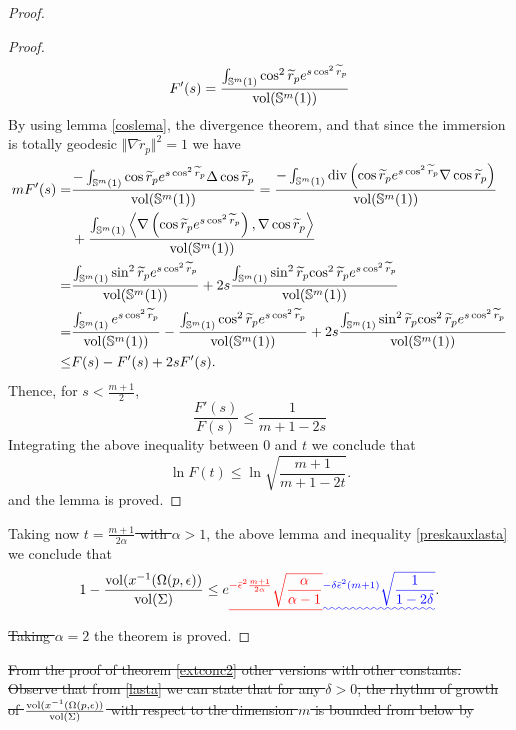 \documentclass{amsart}
\theoremstyle{definition}
\theoremstyle{remark}
\newtheorem{remark}[theorem]{Remark}
\providecommand{\DIFadd}[1]{{\protect\color{blue}\uwave{#1}}} %
\providecommand{\DIFdel}[1]{{\protect\color{red}\sout{#1}}}                      %
\providecommand{\DIFaddbegin}{} %
\providecommand{\DIFaddend}{} %
\providecommand{\DIFdelbegin}{} %
\providecommand{\DIFdelend}{} %
\begin{document}
\begin{proof}
\begin{proof}
    $$
F'(s)=\frac{\int_{\mathbb{S}^m(1)}\cos^2\widetilde{r}_pe^{s \cos^2\widetilde{r}_p}}{{\rm vol}(\mathbb{S}^m(1))}
    $$
 By using lemma \ref{coslema}, the divergence theorem, and that since the immersion is totally geodesic $\Vert \nabla\widetilde{r}_p\Vert^2=1$ we have 
 $$
\begin{aligned}
mF'(s)=&\frac{-\int_{\mathbb{S}^m(1)}\cos\widetilde{r}_pe^{s \cos^2\widetilde{r}_p}\Delta \cos\widetilde{r}_p}{{\rm vol}(\mathbb{S}^m(1))}
=\frac{-\int_{\mathbb{S}^m(1)}{\rm div}\left(\cos\widetilde{r}_pe^{s \cos^2\widetilde{r}_p}\nabla \cos\widetilde{r}_p\right)}{{\rm vol}(\mathbb{S}^m(1))}\\&+\frac{\int_{\mathbb{S}^m(1)}\left\langle\nabla \left(\cos\widetilde{r}_pe^{s \cos^2\widetilde{r}_p}\right),\nabla \cos\widetilde{r}_p\right\rangle}{{\rm vol}(\mathbb{S}^m(1))}\\
=&\frac{\int_{\mathbb{S}^m(1)}\sin^2\widetilde{r}_pe^{s \cos^2\widetilde{r}_p}}{{\rm vol}(\mathbb{S}^m(1))}+2s\frac{\int_{\mathbb{S}^m(1)}\sin^2\widetilde{r}_p{ \cos^2\widetilde{r}_p}e^{s \cos^2\widetilde{r}_p}}{{\rm vol}(\mathbb{S}^m(1))}\\
=&\frac{\int_{\mathbb{S}^m(1)}e^{s \cos^2\widetilde{r}_p}}{{\rm vol}(\mathbb{S}^m(1))}-\frac{\int_{\mathbb{S}^m(1)}\cos^2\widetilde{r}_pe^{s \cos^2\widetilde{r}_p}}{{\rm vol}(\mathbb{S}^m(1))}+2s\frac{\int_{\mathbb{S}^m(1)}\sin^2\widetilde{r}_p{ \cos^2\widetilde{r}_p}e^{s \cos^2\widetilde{r}_p}}{{\rm vol}(\mathbb{S}^m(1))}\\
\leq & F(s)-F'(s)+2sF'(s).
    \end{aligned}
 $$
 Thence, for $s<\frac{m+1}{2}$,
 $$
\frac{F'(s)}{F(s)}\leq \frac{1}{m+1-2s}
 $$
 Integrating the above inequality between $0$ and $t$ we conclude that
 $$
\ln F(t)\leq \ln \sqrt{\frac{m+1}{m+1-2t}}.
 $$
 and the lemma is proved.
\end{proof}
Taking now \DIFdelbegin \DIFdel{$t=\frac{m+1}{2\alpha}$ with $\alpha>1$}\DIFdelend \DIFaddbegin \DIFadd{$t=\delta(m+1)$ with $0\leq \delta<\frac{1}{2}$}\DIFaddend , the above lemma and inequality \eqref{preskauxlasta} we conclude that
\begin{equation}\label{lasta}
     1-\frac{{\rm vol}(x^{-1}(\Omega(p,\epsilon))}{{\rm vol}(\Sigma)}\leq e\DIFdelbegin \DIFdel{^{-\bar\epsilon^2\frac{m+1}{2\alpha}}\sqrt{\frac{\alpha}{\alpha-1}}}\DIFdelend \DIFaddbegin \DIFadd{^{-\delta\bar\epsilon^2(m+1)}\sqrt{\frac{1}{1-2\delta}}}\DIFaddend .
\end{equation}
\DIFdelbegin \DIFdel{Taking $\alpha=2$ }\DIFdelend \DIFaddbegin \DIFadd{and }\DIFaddend the theorem is proved.\end{proof}
\DIFdelbegin %
\DIFdel{From the proof of theorem \ref{extconc2} other versions with other constants. Observe that from \eqref{lasta} we can  state that for any $\delta>0$, the rhythm of growth of $\frac{{\rm vol}(x^{-1}(\Omega(p,\epsilon))}{{\rm vol}(\Sigma)}$ with respect to  the dimension $m$ is bounded from below by
    }\DIFdelend \DIFaddbegin 
\end{document}
